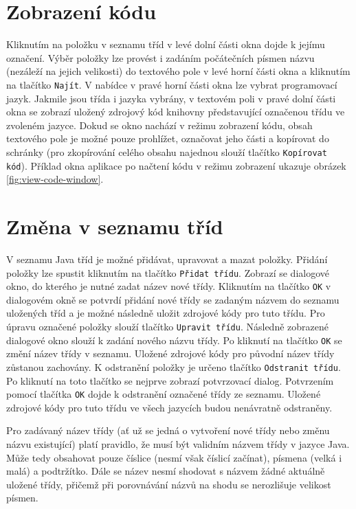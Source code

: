\documentclass[onepage, a4paper, 12pt]{bakalarka}
\begin{document}
\section{Zobrazení kódu}
Kliknutím na položku v seznamu tříd v levé dolní části okna dojde k jejímu označení. Výběr položky lze provést i zadáním počátečních písmen názvu (nezáleží na jejich velikosti) do textového pole v levé horní části okna a kliknutím na tlačítko \texttt{Najít}. V nabídce v pravé horní části okna lze vybrat programovací jazyk. Jakmile jsou třída i jazyka vybrány, v textovém poli v pravé dolní části okna se zobrazí uložený zdrojový kód knihovny představující označenou třídu ve zvoleném jazyce. Dokud se okno nachází v režimu zobrazení kódu, obsah textového pole je možné pouze prohlížet, označovat jeho části a kopírovat do schránky (pro zkopírování celého obsahu najednou slouží tlačítko \texttt{Kopírovat kód}). Příklad okna aplikace po načtení kódu v režimu zobrazení ukazuje obrázek \ref{fig:view-code-window}.

\section{Změna v seznamu tříd}
V seznamu Java tříd je možné přidávat, upravovat a mazat položky. Přidání položky lze spustit kliknutím na tlačítko \texttt{Přidat třídu}. Zobrazí se dialogové okno, do kterého je nutné zadat název nové třídy. Kliknutím na tlačítko \texttt{OK} v dialogovém okně se potvrdí přidání nové třídy se zadaným názvem do seznamu uložených tříd a je možné následně uložit zdrojové kódy pro tuto třídu. Pro úpravu označené položky slouží tlačítko \texttt{Upravit třídu}. Následně zobrazené dialogové okno slouží k zadání nového názvu třídy. Po kliknutí na tlačítko \texttt{OK} se změní název třídy v seznamu. Uložené zdrojové kódy pro původní název třídy zůstanou zachovány. K odstranění položky je určeno tlačítko \texttt{Odstranit třídu}. Po kliknutí na toto tlačítko se nejprve zobrazí potvrzovací dialog. Potvrzením pomocí tlačítka \texttt{OK} dojde k odstranění označené třídy ze seznamu. Uložené zdrojové kódy pro tuto třídu ve všech jazycích budou nenávratně odstraněny.\par
Pro zadávaný název třídy (ať už se jedná o vytvoření nové třídy nebo změnu názvu existující) platí pravidlo, že musí být validním názvem třídy v jazyce Java. Může tedy obsahovat pouze číslice (nesmí však číslicí začínat), písmena (velká i malá) a podtržítko. Dále se název nesmí shodovat s názvem žádné aktuálně uložené třídy, přičemž při porovnávání názvů na shodu se nerozlišuje velikost písmen.
\end{document}
